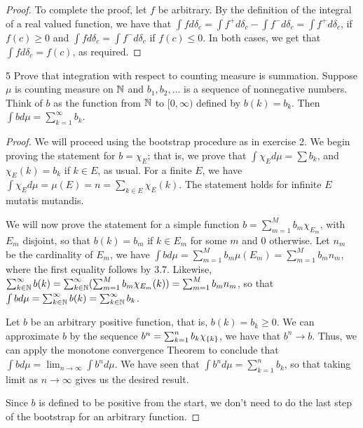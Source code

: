 \begin{proof}
To complete the proof, let $f$ be arbitrary.
By the definition of the integral of a real valued function, we have that $\int f d\delta_c = \int f^+ d\delta_c - \int f^- d\delta_c = \int f^+ d\delta_c$, if $f(c) \geq 0$ and $\int f d\delta_c = \int f^- d\delta_c$ if $f(c) \leq 0$.
In both cases, we get that $\int f d\delta_c = f(c)$, as required.
\end{proof} 

\begin{exercise}{5}
Prove that integration with respect to counting measure is summation.
Suppose $\mu$ is counting measure on $\mathbb{N}$ and $b_1, b_2, \dots$ is a sequence of nonnegative numbers.
Think of $b$ as the function from $\mathbb{N}$ to $[0, \infty)$ defined by $b(k) = b_k$.
Then $\int b d\mu = \sum_{k=1}^\infty b_k$.
\end{exercise}
\begin{proof}
We will proceed using the bootstrap procedure as in exercise 2.
We begin proving the statement for $b= \chi_E$;
that is, we prove that $\int \chi_E d\mu = \sum b_k$, and $\chi_E(k) = b_k$ if $k \in E$, as usual.
For a finite $E$, we have $\int \chi_E d\mu = \mu(E) = n = \sum_{k \in E} \chi_E(k)$.
The statement holds for infinite $E$ mutatis mutandis.

We will now prove the statement for a simple function $b = \sum_{m = 1}^M b_m \chi_{E_m}$, with $E_m$ disjoint, so that $b(k) = b_m$ if $k \in E_m$ for some $m$ and 0 otherwise.
Let $n_m$ be the cardinality of $E_m$, we have $\int b d\mu = \sum_{m=1}^M b_m \mu(E_m) = \sum_{m=1}^M b_m n_m$, where the first equality follows by 3.7.
Likewise, $\sum_{k \in \mathbb{N}}^\infty b(k) = \sum_{k \in \mathbb{N}}^\infty (\sum_{m = 1}^M b_m \chi_{E_m}(k)) = \sum_{m=1}^M b_m n_m$, so that $\int b d\mu = \sum_{k \in \mathbb{N}}^\infty b(k) = \sum_{k \in \mathbb{N}}^\infty b_k$.

Let $b$ be an arbitrary positive function, that is, $b(k) = b_k \geq 0$.
We can approximate $b$ by the sequence $b^n = \sum_{k = 1}^n b_k\chi_{\{k\}}$, we have that $b^n \to b$. 
Thus, we can apply the monotone convergence Theorem to conclude that $\int b d\mu = \lim_{n \to \infty} \int b^n d\mu$.
We have seen that $\int b^n d\mu = \sum_{k=1}^n b_k$, so that taking limit as $n \to \infty$ gives us the desired result.

Since $b$ is defined to be positive from the start, we don't need to do the last step of the bootstrap for an arbitrary function.
\end{proof} 

